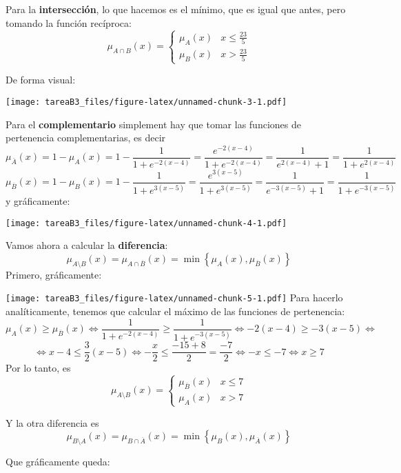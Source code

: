 \documentclass[
]{article}
\begin{document}
Para la \textbf{intersección}, lo que hacemos es el mínimo, que es igual
que antes, pero tomando la función recíproca:
\[\mu_{A\cap B}\left(x\right)=\begin{cases}
\mu_{A}\left(x\right) & x\leq\frac{23}{5}\\
\mu_{B}\left(x\right) & x>\frac{23}{5}
\end{cases}\]

De forma visual:

\texttt{[image: tareaB3\_files/figure-latex/unnamed-chunk-3-1.pdf]}

Para el \textbf{complementario} simplement hay que tomar las funciones
de pertenencia complementarias, es decir
\[\mu_{\overline{A}}\left(x\right)=1-\mu_{A}\left(x\right)=1-\frac{1}{1+e^{-2\left(x-4\right)}}=\frac{e^{-2\left(x-4\right)}}{1+e^{-2\left(x-4\right)}}=\frac{1}{e^{2\left(x-4\right)}+1}=\frac{1}{1+e^{2\left(x-4\right)}}\]
\[\mu_{\overline{B}}\left(x\right)=1-\mu_{B}\left(x\right)=1-\frac{1}{1+e^{3\left(x-5\right)}}=\frac{e^{3\left(x-5\right)}}{1+e^{3\left(x-5\right)}}=\frac{1}{e^{-3\left(x-5\right)}+1}=\frac{1}{1+e^{-3\left(x-5\right)}}\]
y gráficamente:

\texttt{[image: tareaB3\_files/figure-latex/unnamed-chunk-4-1.pdf]}

Vamos ahora a calcular la \textbf{diferencia}:
\[\mu_{A\setminus B}\left(x\right)=\mu_{A\cap\overline{B}}\left(x\right)=\min\left\{ \mu_{A}\left(x\right),\mu_{\overline{B}}\left(x\right)\right\}\]
Primero, gráficamente:

\texttt{[image: tareaB3\_files/figure-latex/unnamed-chunk-5-1.pdf]} Para
hacerlo analíticamente, tenemos que calcular el máximo de las funciones
de pertenencia:
\[\mu_{A}\left(x\right)\geq\mu_{\overline{B}}\left(x\right)\iff\frac{1}{1+e^{-2\left(x-4\right)}}\geq\frac{1}{1+e^{-3\left(x-5\right)}}\iff-2\left(x-4\right)\geq-3\left(x-5\right)\iff\]
\[\iff x-4\leq\frac{3}{2}\left(x-5\right)\iff-\frac{x}{2}\leq\frac{-15+8}{2}=\frac{-7}{2}\iff-x\leq-7\iff x\geq7\]
Por lo tanto, es \[\mu_{A\setminus B}\left(x\right)=\begin{cases}
\mu_{\overline{B}}\left(x\right) & x\leq7\\
\mu_{A}\left(x\right) & x>7
\end{cases}\]

Y la otra diferencia es
\[\mu_{B\setminus A}\left(x\right)=\mu_{B\cap\overline{A}}\left(x\right)=\min\left\{ \mu_{B}\left(x\right),\mu_{\overline{A}}\left(x\right)\right\}\]

Que gráficamente queda:
\end{document}
